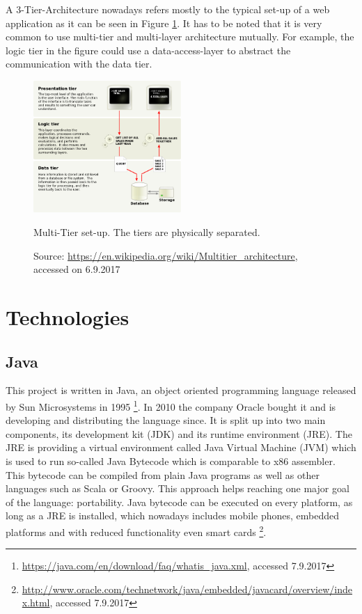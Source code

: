 A 3-Tier-Architecture nowadays refers mostly to the typical set-up of a web application as it can be seen in Figure \ref{fig:multi-tier}. It has to be noted that it is very common to use multi-tier and multi-layer architecture mutually. For example, the logic tier in the figure could use a data-access-layer to abstract the communication with the data tier. 

\begin{figure}[htbp]
	\centering
	\label{fig:multi-tier}
	\includegraphics[width=0.5\textwidth]{./content/pictures/multi-tier.jpg}
	\caption{Multi-Tier set-up. The tiers are physically separated.}
	\caption*{Source: \href{https://en.wikipedia.org/wiki/Multitier\_architecture}{https://en.wikipedia.org/wiki/Multitier\_architecture}, accessed on 6.9.2017}
\end{figure}

\section{Technologies}
\subsection{Java}
This project is written in Java, an object oriented programming language released by Sun Microsystems in 1995  \footnote{\href{https://java.com/en/download/faq/whatis_java.xml}{https://java.com/en/download/faq/whatis\_java.xml}, accessed 7.9.2017}. In 2010 the company Oracle bought it and is developing and distributing the language since. It is split up into two main components, its development kit (JDK) and its runtime environment (JRE). The JRE is providing a virtual environment called Java Virtual Machine (JVM) which is used to run so-called Java Bytecode which is comparable to x86 assembler. This bytecode can be compiled from plain Java programs as well as other languages such as Scala or Groovy. 
This approach helps reaching one major goal of the language: portability. Java bytecode can be executed on every platform, as long as a JRE is installed, which nowadays includes mobile phones, embedded platforms and with reduced functionality even smart cards \footnote{\href{http://www.oracle.com/technetwork/java/embedded/javacard/overview/index.html}{http://www.oracle.com/technetwork/java/embedded/javacard/overview/index.html}, accessed 7.9.2017}. 

